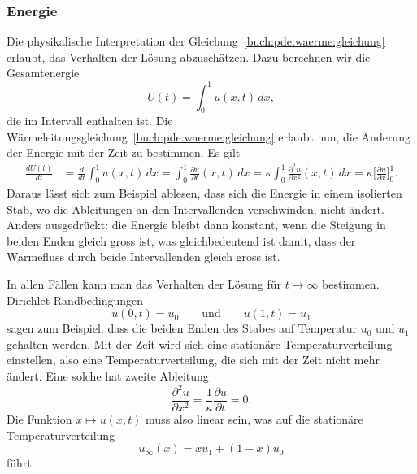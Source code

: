 \subsubsection{Energie}
Die physikalische Interpretation der
Gleichung~\eqref{buch:pde:waerme:gleichung}
erlaubt, das Verhalten der Lösung abzuschätzen.
Dazu berechnen wir die Gesamtenergie
\[
U(t) = \int_0^1 u(x,t)\,dx,
\]
die im Intervall enthalten ist.
Die Wärmeleitungsgleichung~\ref{buch:pde:waerme:gleichung} erlaubt nun,
die Änderung der Energie mit der Zeit zu bestimmen.
Es gilt
\begin{align*}
\frac{dU(t)}{dt}
&=
\frac{d}{dt} \int_0^1 u(x,t)\,dx
=
\int_0^1 \frac{\partial u}{\partial t} (x,t)\,dx
=
\kappa \int_0^1 \frac{\partial^2u}{\partial x^2}(x,t)\,dx
=
\kappa \biggl[\frac{\partial u}{\partial x}\biggr]_0^1.
\end{align*}
Daraus lässt sich zum Beispiel ablesen, dass sich die Energie in
einem isolierten Stab, wo die Ableitungen an den Intervallenden
verschwinden, nicht ändert.
Anders ausgedrückt:
die Energie bleibt dann konstant, wenn die Steigung
in beiden Enden gleich gross ist, was gleichbedeutend ist damit,
dass der Wärmefluss durch beide Intervallenden gleich gross ist.

In allen Fällen kann man das Verhalten der Lösung für $t\to\infty$
bestimmen.
Dirichlet-Rand\-be\-dingun\-gen 
\[
u(0,t) = u_0 \qquad\text{und}\qquad u(1,t) = u_1
\]
sagen zum Beispiel, dass die beiden Enden des Stabes auf Temperatur
$u_0$ und $u_1$ gehalten werden.
Mit der Zeit wird sich eine stationäre Temperaturverteilung einstellen,
also eine Temperaturverteilung, die sich mit der Zeit nicht mehr ändert.
Eine solche hat zweite Ableitung
\[
\frac{\partial^2u}{\partial x^2}
=
\frac{1}{\kappa} \frac{\partial u}{\partial t} = 0.
\]
Die Funktion $x\mapsto u(x,t)$ muss also linear sein, was auf die
stationäre Temperaturverteilung
\[
u_\infty(x) = xu_1 + (1-x)u_0
\]
führt.

